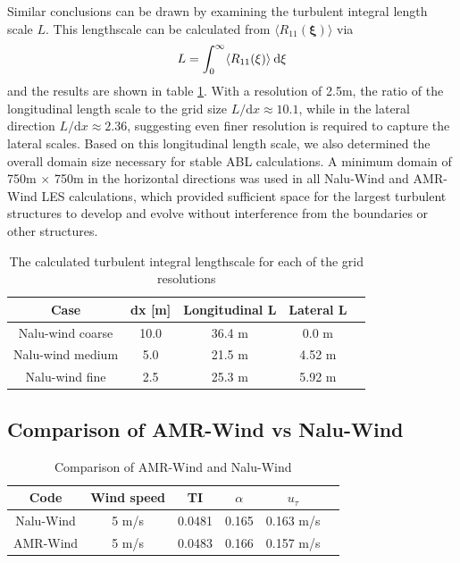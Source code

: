 Similar conclusions can be drawn by examining the turbulent integral
length scale $L$.  This lengthscale can be calculated from $\langle
R_{11}(\boldsymbol{\xi}) \rangle$ via
\begin{equation}
  L = \int_0^\infty \langle R_{11}(\xi) \rangle \: {\textrm d}\xi
\end{equation}
and the results are shown in table \ref{tab:GridStudyLscale}.  With a
resolution of 2.5m, the ratio of the longitudinal length scale to the
grid size $L/\textrm{d}x \approx 10.1$, while in the lateral direction
$L/\textrm{d}x \approx 2.36$, suggesting even finer resolution is
required to capture the lateral scales.  Based on this longitudinal
length scale, we also determined the overall domain size necessary for
stable ABL calculations.  A minimum domain of 750m $\times$ 750m in
the horizontal directions was used in all Nalu-Wind and AMR-Wind LES
calculations, which provided sufficient space for the largest
turbulent structures to develop and evolve without interference from
the boundaries or other structures.

\begin{table} %
\caption{\label{tab:GridStudyLscale} The calculated turbulent integral
  lengthscale for each of the grid resolutions} \centering
\begin{tabular}{ccccc}
  \hline
  Case              & dx [m] & Longitudinal L  & Lateral L \\
  \hline
  Nalu-wind coarse  &  10.0  & 36.4 m         & 0.0 m     \\
  Nalu-wind medium  &   5.0  & 21.5 m         & 4.52 m    \\
  Nalu-wind fine    &   2.5  & 25.3 m         & 5.92 m    \\
\hline
\end{tabular}
\end{table}

\subsection{Comparison of AMR-Wind vs Nalu-Wind}

\begin{table}
\caption{\label{tab:CompareAMRvsNalu} Comparison of AMR-Wind and
  Nalu-Wind} \centering
\begin{tabular}{cccccc}
  \hline
  Code & Wind speed & TI      &  $\alpha$  &   $u_\tau$ \\ %
  \hline
  Nalu-Wind & 5 m/s &  0.0481 &  0.165     &  0.163 m/s \\ %
  AMR-Wind  & 5 m/s &  0.0483 &  0.166     &  0.157 m/s \\ %
  \hline
\end{tabular}
\end{table}

